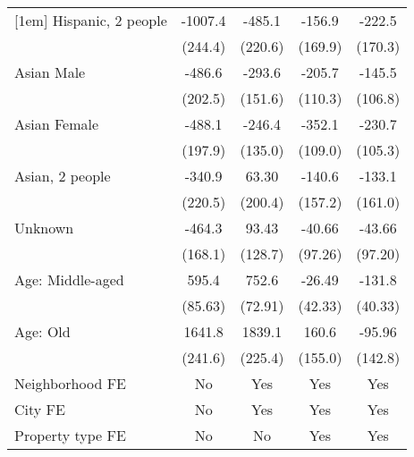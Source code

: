 {\begin{longtable}{l*{4}{c}}
[1em]
Hispanic, 2 people &     -1007.4\sym{***}&      -485.1\sym{*}  &      -156.9         &      -222.5         \\
                    &     (244.4)         &     (220.6)         &     (169.9)         &     (170.3)         \\
[1em]
Asian Male          &      -486.6\sym{*}  &      -293.6         &      -205.7         &      -145.5         \\
                    &     (202.5)         &     (151.6)         &     (110.3)         &     (106.8)         \\
[1em]
Asian Female        &      -488.1\sym{*}  &      -246.4         &      -352.1\sym{**} &      -230.7\sym{*}  \\
                    &     (197.9)         &     (135.0)         &     (109.0)         &     (105.3)         \\
[1em]
Asian, 2 people    &      -340.9         &       63.30         &      -140.6         &      -133.1         \\
                    &     (220.5)         &     (200.4)         &     (157.2)         &     (161.0)         \\
[1em]
Unknown             &      -464.3\sym{**} &       93.43         &      -40.66         &      -43.66         \\
                    &     (168.1)         &     (128.7)         &     (97.26)         &     (97.20)         \\
[1em]
Age: Middle-aged         &       595.4\sym{***}&       752.6\sym{***}&      -26.49         &      -131.8\sym{**} \\
                    &     (85.63)         &     (72.91)         &     (42.33)         &     (40.33)         \\
[1em]
Age: Old           &      1641.8\sym{***}&      1839.1\sym{***}&       160.6         &      -95.96         \\
                    &     (241.6)         &     (225.4)         &     (155.0)         &     (142.8)         \\
[1em]
Neighborhood FE        &           No          &           Yes         &           Yes         &           Yes         \\
[1em]
City FE       &          No           &       Yes         &       Yes &     Yes \\
[1em]
Property type FE           &            No         &         No            &           Yes         &           Yes         \\

\end{longtable}}
